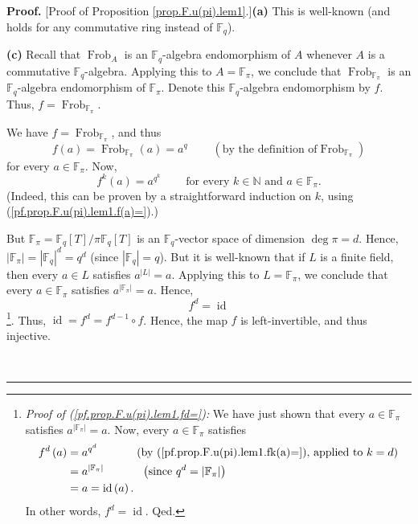 \documentclass[numbers=enddot,12pt,final,onecolumn,notitlepage]{scrartcl}%
\theoremstyle{definition}
\newenvironment{proof}[1][Proof]{\noindent\textbf{#1.} }{\ \rule{0.5em}{0.5em}}
\begin{document}
\begin{proof}
[Proof of Proposition \ref{prop.F.u(pi).lem1}.]\textbf{(a)} This is well-known
(and holds for any commutative ring instead of $\mathbb{F}_{q}$). \medskip

\textbf{(c)} Recall that $\operatorname*{Frob}\nolimits_{A}$ is an
$\mathbb{F}_{q}$-algebra endomorphism of $A$ whenever $A$ is a commutative
$\mathbb{F}_{q}$-algebra. Applying this to $A=\mathbb{F}_{\pi}$, we conclude
that $\operatorname*{Frob}\nolimits_{\mathbb{F}_{\pi}}$ is an $\mathbb{F}_{q}%
$-algebra endomorphism of $\mathbb{F}_{\pi}$. Denote this $\mathbb{F}_{q}%
$-algebra endomorphism by $f$. Thus, $f=\operatorname*{Frob}%
\nolimits_{\mathbb{F}_{\pi}}$.

We have $f=\operatorname*{Frob}\nolimits_{\mathbb{F}_{\pi}}$, and thus
\begin{equation}
f\left(  a\right)  =\operatorname*{Frob}\nolimits_{\mathbb{F}_{\pi}}\left(
a\right)  =a^{q}\ \ \ \ \ \ \ \ \ \ \left(  \text{by the definition of
}\operatorname*{Frob}\nolimits_{\mathbb{F}_{\pi}}\right)
\label{pf.prop.F.u(pi).lem1.f(a)=}%
\end{equation}
for every $a\in\mathbb{F}_{\pi}$. Now,%
\begin{equation}
f^{k}\left(  a\right)  =a^{q^{k}}\ \ \ \ \ \ \ \ \ \ \text{for every }%
k\in\mathbb{N}\text{ and }a\in\mathbb{F}_{\pi}.
\label{pf.prop.F.u(pi).lem1.fk(a)=}%
\end{equation}
(Indeed, this can be proven by a straightforward induction on $k$, using
(\ref{pf.prop.F.u(pi).lem1.f(a)=}).)

But $\mathbb{F}_{\pi}=\mathbb{F}_{q}\left[  T\right]  /\pi\mathbb{F}%
_{q}\left[  T\right]  $ is an $\mathbb{F}_{q}$-vector space of dimension
$\deg\pi=d$. Hence, $\left\vert \mathbb{F}_{\pi}\right\vert =\left\vert
\mathbb{F}_{q}\right\vert ^{d}=q^{d}$ (since $\left\vert \mathbb{F}%
_{q}\right\vert =q$). But it is well-known that if $L$ is a finite field, then
every $a\in L$ satisfies $a^{\left\vert L\right\vert }=a$. Applying this to
$L=\mathbb{F}_{\pi}$, we conclude that every $a\in\mathbb{F}_{\pi}$ satisfies
$a^{\left\vert \mathbb{F}_{\pi}\right\vert }=a$. Hence,%
\begin{equation}
f^{d}=\operatorname*{id} \label{pf.prop.F.u(pi).lem1.fd=}%
\end{equation}
\footnote{\textit{Proof of (\ref{pf.prop.F.u(pi).lem1.fd=}):} We have just
shown that every $a\in\mathbb{F}_{\pi}$ satisfies $a^{\left\vert
\mathbb{F}_{\pi}\right\vert }=a$. Now, every $a\in\mathbb{F}_{\pi}$ satisfies%
\begin{align*}
f^{d}\left(  a\right)   &  =a^{q^{d}}\ \ \ \ \ \ \ \ \ \ \left(  \text{by
(\ref{pf.prop.F.u(pi).lem1.fk(a)=}), applied to }k=d\right) \\
&  =a^{\left\vert \mathbb{F}_{\pi}\right\vert }\ \ \ \ \ \ \ \ \ \ \left(
\text{since }q^{d}=\left\vert \mathbb{F}_{\pi}\right\vert \right) \\
&  =a=\operatorname*{id}\left(  a\right)  .
\end{align*}
In other words, $f^{d}=\operatorname*{id}$. Qed.}. Thus, $\operatorname*{id}%
=f^{d}=f^{d-1}\circ f$. Hence, the map $f$ is left-invertible, and thus injective.


\end{proof}
\end{document}

